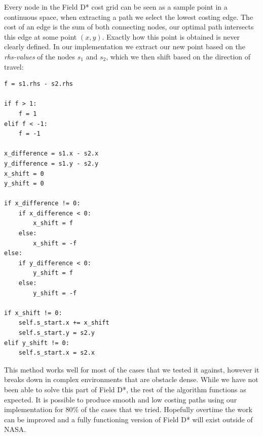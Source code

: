 \noindent
Every node in the Field D* cost grid can be seen as a sample point in a continuous space, when extracting a path we select the lowest costing edge. The cost of an edge is the sum of both connecting nodes, our optimal path intersects this edge at some point $(x, y)$. Exactly how this point is obtained is never clearly defined. In our implementation we extract our new point based on the \textit{rhs-values} of the nodes $s_{1}$ and $s_{2}$, which we then shift based on the direction of travel: \\

\begin{lstlisting}
f = s1.rhs - s2.rhs

if f > 1:
	f = 1
elif f < -1:
	f = -1

x_difference = s1.x - s2.x
y_difference = s1.y - s2.y
x_shift = 0
y_shift = 0

if x_difference != 0:
	if x_difference < 0:
		x_shift = f
	else:
		x_shift = -f
else:
	if y_difference < 0:
		y_shift = f
	else:
		y_shift = -f

if x_shift != 0:
	self.s_start.x += x_shift
	self.s_start.y = s2.y
elif y_shift != 0:
	self.s_start.x = s2.x
\end{lstlisting}

\noindent
This method works well for most of the cases that we tested it against, however it breaks down in complex environments that are obstacle dense. While we have not been able to solve this part of Field D*, the rest of the algorithm functions as expected. It is possible to produce smooth and low costing paths using our implementation for 80\% of the cases that we tried. Hopefully overtime the work can be improved and a fully functioning version of Field D* will exist outside of NASA.




